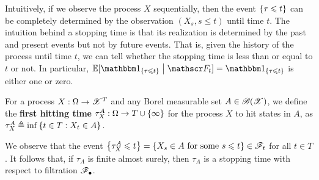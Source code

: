 \documentclass[a4paper,10pt,english]{article}
\begin{document}
\begin{rem}
Intuitively, if we observe the process $X$ sequentially, 
then the event $\left\{\tau \leqslant t\right\}$ can be completely determined by the observation $(X_s, s \le t)$ until time $t$. 
The intuition behind a stopping time is that its realization is determined by the past and present events but not by future events. 
That is, given the history of the process until time $t$, we can tell whether the stopping time is less than or  equal to $t$ or not. 
In particular, $\E[\SetIn{\tau \le t}\given \sF_t]=\SetIn{\tau \le t}$ is either one or zero. 
\end{rem}
\begin{defn}
For a process $X:\Omega\to\mathscr{X}^T$ and any Borel measurable set $A \in \mathscr{B}(\mathscr{X})$, we define the \textbf{first hitting time} $\tau_X^A: \Omega \to T\cup\left\{\infty\right\}$ for the process $X$ to hit states in $A$, as 
$\tau_X^A \triangleq \inf\left\{t \in T: X_t \in A\right\}.$
\end{defn}
\begin{shaded}
\begin{exmp}
We observe that the event $\left\{\tau_X^A \leqslant t\right\} = \left\{X_s \in A \text{ for some }s \leqslant t\right\} \in\mathscr{F}_t$ for all $t \in T$. 
It follows that, if $\tau_A$ is finite almost surely, then $\tau_A$ is a stopping time with respect to filtration $\mathscr{F}_\bullet$.
\end{exmp}
\end{shaded}
\end{document}
